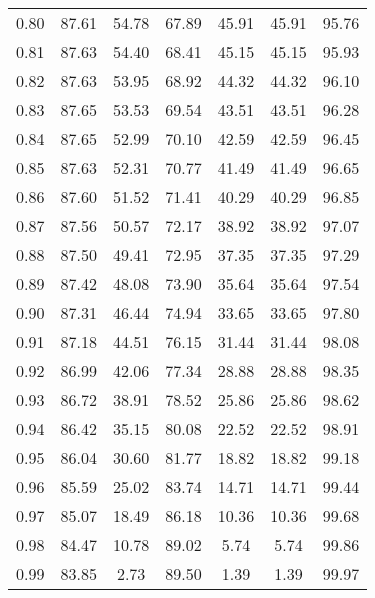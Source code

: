 \begin{tabular}{|c|c|c|c|c|c|c|}
      0.80 &     87.61 &     54.78 &      67.89 &   45.91 &      45.91 &         95.76 \\
      0.81 &     87.63 &     54.40 &      68.41 &   45.15 &      45.15 &         95.93 \\
      0.82 &     87.63 &     53.95 &      68.92 &   44.32 &      44.32 &         96.10 \\
      0.83 &     87.65 &     53.53 &      69.54 &   43.51 &      43.51 &         96.28 \\
      0.84 &     87.65 &     52.99 &      70.10 &   42.59 &      42.59 &         96.45 \\
      0.85 &     87.63 &     52.31 &      70.77 &   41.49 &      41.49 &         96.65 \\
      0.86 &     87.60 &     51.52 &      71.41 &   40.29 &      40.29 &         96.85 \\
      0.87 &     87.56 &     50.57 &      72.17 &   38.92 &      38.92 &         97.07 \\
      0.88 &     87.50 &     49.41 &      72.95 &   37.35 &      37.35 &         97.29 \\
      0.89 &     87.42 &     48.08 &      73.90 &   35.64 &      35.64 &         97.54 \\
      0.90 &     87.31 &     46.44 &      74.94 &   33.65 &      33.65 &         97.80 \\
      0.91 &     87.18 &     44.51 &      76.15 &   31.44 &      31.44 &         98.08 \\
      0.92 &     86.99 &     42.06 &      77.34 &   28.88 &      28.88 &         98.35 \\
      0.93 &     86.72 &     38.91 &      78.52 &   25.86 &      25.86 &         98.62 \\
      0.94 &     86.42 &     35.15 &      80.08 &   22.52 &      22.52 &         98.91 \\
      0.95 &     86.04 &     30.60 &      81.77 &   18.82 &      18.82 &         99.18 \\
      0.96 &     85.59 &     25.02 &      83.74 &   14.71 &      14.71 &         99.44 \\
      0.97 &     85.07 &     18.49 &      86.18 &   10.36 &      10.36 &         99.68 \\
      0.98 &     84.47 &     10.78 &      89.02 &    5.74 &       5.74 &         99.86 \\
      0.99 &     83.85 &      2.73 &      89.50 &    1.39 &       1.39 &         99.97 \\
\bottomrule
\end{tabular}
